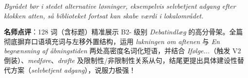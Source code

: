 \begin{answerbox}
\textit{Byrådet bør i stedet  alternative løsninger, eksempelvis selvbetjent adgang efter klokken atten, så biblioteket fortsat kan skabe værdi i lokalområdet.}

\small\textbf{名师点评}：128 词（含标题）精准展示 B2- 级别 \textit{Debatindlæg} 的高分骨架。全篇彻底摒弃口语填充词与左移外置结构，运用 \textit{lukningen om aftenen} 与 \textit{En begrænsning af åbningstiden} 两处高密度名词化短语，并结合 \textit{Ifølge...}（触发 V2 倒装）、\textit{medføre}、\textit{drøfte} 及限制性/非限制性关系从句，结尾更提出具体建设性替代方案（\textit{selvbetjent adgang}），说服力极强！
\end{answerbox}